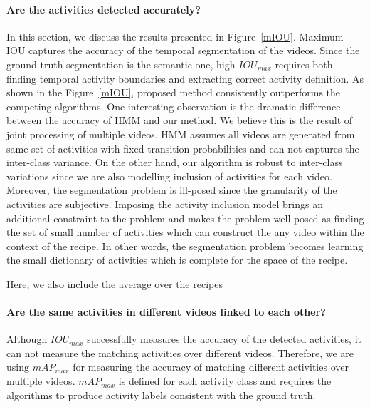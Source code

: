 \paragraph{Are the activities detected accurately?}
In this section, we discuss the results presented in Figure~\ref{mIOU}. Maximum-IOU captures the accuracy of the temporal segmentation of the videos. Since the ground-truth segmentation is the semantic one, high $IOU_{max}$ requires both finding temporal activity boundaries and extracting correct activity definition. As shown in the Figure~\ref{mIOU}, proposed method consistently outperforms the competing algorithms. One interesting observation is the dramatic difference between the accuracy of HMM and our method. We believe this is the result of joint processing of multiple videos. HMM assumes all videos are generated from same set of activities with fixed transition probabilities and can not captures the inter-class variance. On the other hand, our algorithm is robust to inter-class variations since we are also modelling inclusion of activities for each video. Moreover, the segmentation problem is ill-posed since the granularity of the activities are subjective. Imposing the activity inclusion model brings an additional constraint to the problem and makes the problem well-posed as finding the set of small number of activities which can construct the any video within the context of the recipe. In other words, the segmentation problem becomes learning the small dictionary of activities which is complete for the space of the recipe.


Here, we also include the average over the recipes
\begin{table}
\caption{Average of $IOU_{max}$ and $mAP_{max}$ over recipes.}
{\small
{}}
\normalsize
\end{table}

\paragraph{Are the same activities in different videos linked to each other?}
Although $IOU_{max}$ successfully measures the accuracy of the detected activities, it can not measure the matching activities over different videos. Therefore, we are using $mAP_{max}$ for measuring the accuracy of matching different activities over multiple videos. $mAP_{max}$ is defined for each activity class and requires the algorithms to produce activity labels consistent with the ground truth.

